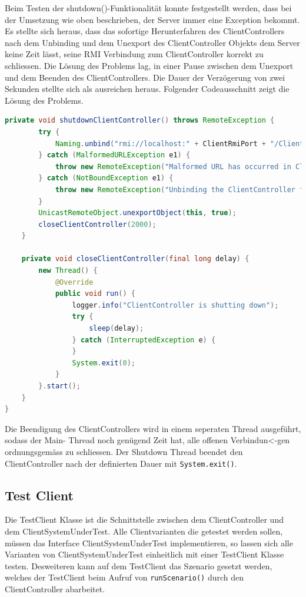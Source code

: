 Beim Testen der shutdown()-Funktionalität konnte festgestellt werden, dass bei der Umsetzung wie oben beschrieben, der Server immer eine Exception bekommt. Es stellte sich heraus, dass das sofortige Herunterfahren des ClientControllers nach dem Unbinding und dem Unexport des ClientController Objekts dem Server keine Zeit lässt, seine RMI Verbindung zum ClientController korrekt zu schliessen. Die Lösung des Problems lag, in einer Pause zwischen dem Unexport und dem Beenden des ClientControllers. Die Dauer der Verzögerung von zwei Sekunden stellte sich als ausreichen heraus. Folgender Codeausschnitt zeigt die Lösung des Problems.
\begin{lstlisting}[language=java, breaklines=true]
private void shutdownClientController() throws RemoteException {
		try {
			Naming.unbind("rmi://localhost:" + ClientRmiPort + "/Client");
		} catch (MalformedURLException e1) {
			throw new RemoteException("Malformed URL has occurred in ClientController", e1);
		} catch (NotBoundException e1) {
			throw new RemoteException("Unbinding the ClientController failed", e1);
		}
		UnicastRemoteObject.unexportObject(this, true);
		closeClientController(2000);
	}

	private void closeClientController(final long delay) {
		new Thread() {
			@Override
			public void run() {
				logger.info("ClientController is shutting down");
				try {
					sleep(delay);
				} catch (InterruptedException e) {
				}
				System.exit(0);
			}
		}.start();
	}
}
\end{lstlisting}
Die Beendigung des ClientControllers wird in einem seperaten Thread ausgeführt, so\-dass der Main- Thread noch ge\-nü\-gend Zeit hat, alle of\-fe\-nen Ver\-bin\-dun<-gen ord\-nungs\-gemäss zu schliessen. Der Shutdown Thread beendet den ClientController nach der definierten Dauer mit \verb+System.exit()+.   

\subsection{Test Client}
\label{sec:testclient}
Die TestClient Klasse ist die Schnittstelle zwischen dem ClientController und dem ClientSystemUnderTest. Alle Clientvarianten die getestet werden sollen, müssen das Interface ClientSystemUnderTest implementieren, so lassen sich alle Varianten von ClientSystemUnderTest einheitlich mit einer TestClient Klasse testen. Desweiteren kann auf dem TestClient das Szenario gesetzt werden, welches der TestClient beim Aufruf von \verb+runScenario()+ durch den ClientController abarbeitet.

